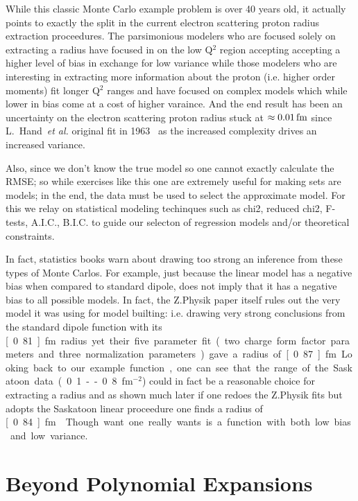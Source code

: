 \documentclass[10pt,aps,prc,twocolumn]{revtex4-1}
\begin{document}
While this classic Monte Carlo example problem is over 40 years old, it actually points to exactly the split in the current electron
scattering proton radius extraction proceedures.     The parsimonious modelers who are focused solely on extracting a radius have
focused in on the low Q$^2$ region accepting accepting a higher level of bias in exchange for low variance while those modelers
who are interesting in extracting more information about the proton (i.e. higher order moments) fit longer Q$^2$ ranges and have
focused on complex models which while lower in bias come at a cost of higher varaince.  
And the end result has been an uncertainty on the electron scattering proton radius stuck at $\approx \unit[0.01]{fm}$ since 
L.~Hand~\textit{et al.} original fit in 1963~\cite{} as the increased complexity drives an increased variance.

Also, since we don't know the true model so one cannot exactly calculate the RMSE; so while exercises like this one are
extremely useful for making sets are models; in the end, the data must be used to select the approximate model. 
For this we relay on statistical modeling techinques such as chi2, reduced chi2, F-tests, A.I.C., B.I.C. to guide our selecton of
regression models and/or theoretical constraints.

In fact, statistics books warn about drawing too strong an inference from these types of Monte Carlos.   For example,
just because the linear model has a negative bias when compared to standard dipole, does not imply that it has a negative bias
to all possible models.
In fact, the Z.Physik paper itself rules out the very model it was using for model builting: i.e. drawing very strong conclusions from the standard dipole
function with its \unit[0.81]{fm} radius yet their five parameter fit (two charge form factor parameters and three normalization parameters)
gave a radius of \unit[0.87]{fm}.

Looking back to our example function, one can see that the range of the Saskatoon data (0.1 -- 0.8 fm$^{-2}$) could in fact be a reasonable
choice for extracting a radius and as shown much later if one redoes the Z.Physik fits but adopts the Saskatoon linear proceedure one finds
a radius of \unit[0.84]{fm}~\cite{Higinbotham:2015rja}.   Though want one really wants is a function with both low bias and low variance.

\section{Beyond Polynomial Expansions}
\end{document}
